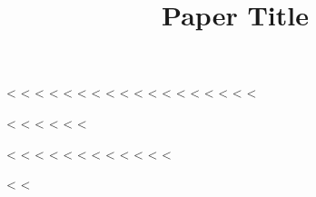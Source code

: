 {{<%
\ifpdftex
<%
<%
<%
<%
<%
<%
<%
<%
<%
<%
<%
<%
<%
<%
\fi
<%
<%
<%

<%
<%
<%
<%
<%
<%

<%
<%
<%
\raggedbottom     %
<%
<%
<%
\ifluatex
<%
<%
<%
<%
<%
\fi
<%

<%
<%
\title{Paper Title}

\author{ \and {}}



%
%

}}
